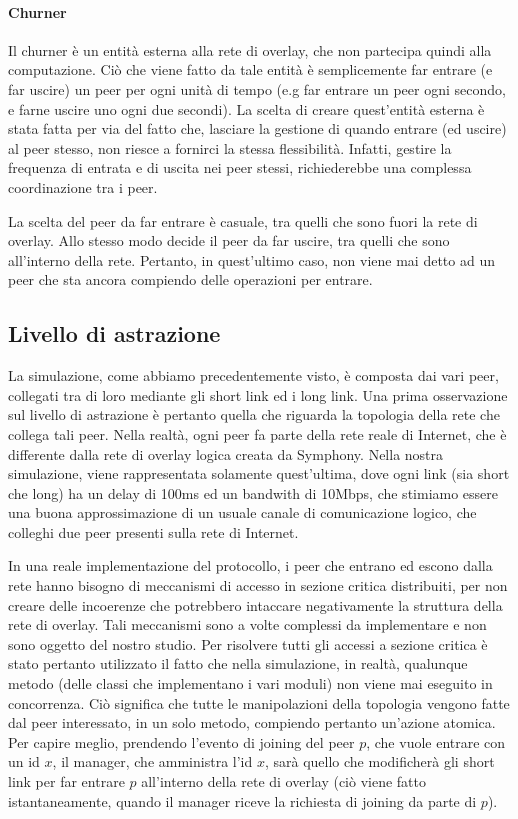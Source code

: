 \documentclass[prodmode,acmtap]{acmlarge}
\begin{document}
\paragraph{Churner}

Il churner è un entità esterna alla rete di overlay, che non partecipa quindi alla computazione. Ciò che viene fatto da tale entità è semplicemente far entrare (e far uscire) un peer per ogni unità di tempo (e.g far entrare un peer ogni secondo, e farne uscire uno ogni due secondi). La scelta di creare quest'entità esterna è stata fatta per via del fatto che, lasciare la gestione di quando entrare (ed uscire) al peer stesso, non riesce a fornirci la stessa flessibilità. Infatti, gestire la frequenza di entrata e di uscita nei peer stessi, richiederebbe una complessa coordinazione tra i peer. 

La scelta del peer da far entrare è casuale, tra quelli che sono fuori la rete di overlay. Allo stesso modo decide il peer da far uscire, tra quelli che sono all'interno della rete. Pertanto, in quest'ultimo caso, non viene mai detto ad un peer che sta ancora compiendo delle operazioni per entrare.


\subsection{Livello di astrazione}

La simulazione, come abbiamo precedentemente visto, è composta dai vari peer, collegati tra di loro mediante gli short link ed i long link. Una prima osservazione sul livello di astrazione è pertanto quella che riguarda la topologia della rete che collega tali peer. Nella realtà, ogni peer fa parte della rete reale di Internet, che è differente dalla rete di overlay logica creata da Symphony. Nella nostra simulazione, viene rappresentata solamente quest'ultima, dove ogni link (sia short che long) ha un delay di 100ms ed un bandwith di 10Mbps, che stimiamo essere una buona approssimazione di un usuale canale di comunicazione logico, che colleghi due peer presenti sulla rete di Internet.

In una reale implementazione del protocollo, i peer che entrano ed escono dalla rete hanno bisogno di meccanismi di accesso in sezione critica distribuiti, per non creare delle incoerenze che potrebbero intaccare negativamente la struttura della rete di overlay. Tali meccanismi sono a volte complessi da implementare e non sono oggetto del nostro studio. Per risolvere tutti gli accessi a sezione critica è stato pertanto utilizzato il fatto che nella simulazione, in realtà, qualunque metodo (delle classi che implementano i vari moduli) non viene mai eseguito in concorrenza. Ciò significa che tutte le manipolazioni della topologia vengono fatte dal peer interessato, in un solo metodo, compiendo pertanto un'azione atomica. Per capire meglio, prendendo l'evento di joining del peer $p$, che vuole entrare con un id $x$, il manager, che amministra l'id $x$, sarà quello che modificherà gli short link per far entrare $p$ all'interno della rete di overlay (ciò viene fatto istantaneamente, quando il manager riceve la richiesta di joining da parte di $p$).
\end{document}
